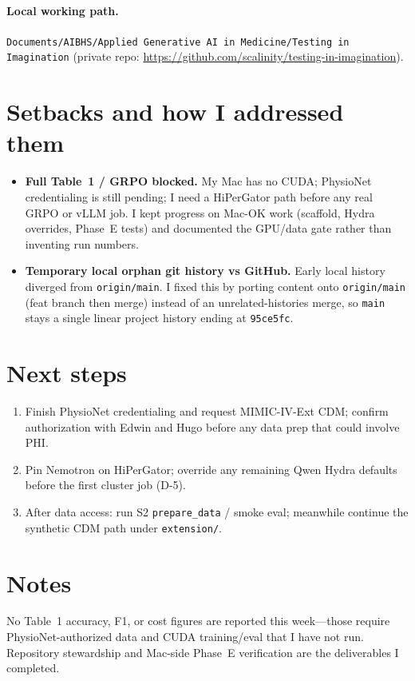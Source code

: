 \documentclass[11pt,letterpaper]{article}
\begin{document}
\paragraph{Local working path.}
\texttt{Documents/AIBHS/Applied Generative AI in Medicine/Testing in Imagination}
(private repo: \url{https://github.com/scalinity/testing-in-imagination}).

\section{Setbacks and how I addressed them}

\begin{itemize}
  \item \textbf{Full Table~1 / GRPO blocked.} My Mac has no CUDA; PhysioNet credentialing is still pending; I need a HiPerGator path before any real GRPO or vLLM job. I kept progress on Mac-OK work (scaffold, Hydra overrides, Phase~E tests) and documented the GPU/data gate rather than inventing run numbers.
  \item \textbf{Temporary local orphan git history vs GitHub.} Early local history diverged from \texttt{origin/main}. I fixed this by porting content onto \texttt{origin/main} (feat branch then merge) instead of an unrelated-histories merge, so \texttt{main} stays a single linear project history ending at \texttt{95ce5fc}.
\end{itemize}

\section{Next steps}

\begin{enumerate}
  \item Finish PhysioNet credentialing and request MIMIC-IV-Ext CDM; confirm authorization with Edwin and Hugo before any data prep that could involve PHI.
  \item Pin Nemotron on HiPerGator; override any remaining Qwen Hydra defaults before the first cluster job (D-5).
  \item After data access: run S2 \texttt{prepare\_data} / smoke eval; meanwhile continue the synthetic CDM path under \texttt{extension/}.
\end{enumerate}

\section*{Notes}
No Table~1 accuracy, F1, or cost figures are reported this week---those require PhysioNet-authorized data and CUDA training/eval that I have not run. Repository stewardship and Mac-side Phase~E verification are the deliverables I completed.
\end{document}
